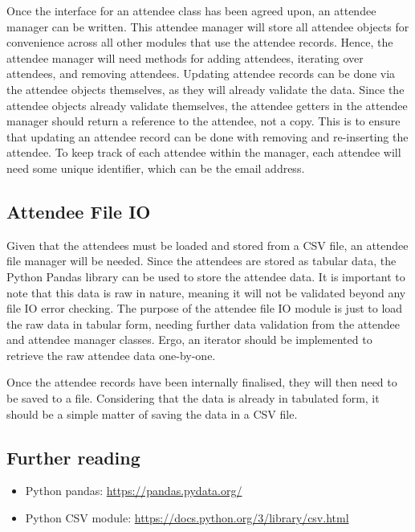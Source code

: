 \documentclass[11pt]{article}
\begin{document}
Once the interface for an attendee class has been agreed upon, an attendee manager can be written. This attendee manager will store all attendee objects for convenience across all other modules that use the attendee records. Hence, the attendee manager will need methods for adding attendees, iterating over attendees, and removing attendees. Updating attendee records can be done via the attendee objects themselves, as they will already validate the data. Since the attendee objects already validate themselves, the attendee getters in the attendee manager should return a reference to the attendee, not a copy. This is to ensure that updating an attendee record can be done with removing and re-inserting the attendee. To keep track of each attendee within the manager, each attendee will need some unique identifier, which can be the email address.

\subsection{Attendee File IO}

Given that the attendees must be loaded and stored from a CSV file, an attendee file manager will be needed. Since the attendees are stored as tabular data, the Python Pandas library can be used to store the attendee data. It is important to note that this data is raw in nature, meaning it will not be validated beyond any file IO error checking. The purpose of the attendee file IO module is just to load the raw data in tabular form, needing further data validation from the attendee and attendee manager classes. Ergo, an iterator should be implemented to retrieve the raw attendee data one-by-one.

Once the attendee records have been internally finalised, they will then need to be saved to a file. Considering that the data is already in tabulated form, it should be a simple matter of saving the data in a CSV file.

\subsection{Further reading}

\begin{itemize}
    \item Python pandas: \url{https://pandas.pydata.org/}
    \item Python CSV module: \url{https://docs.python.org/3/library/csv.html}
\end{itemize}
\end{document}
